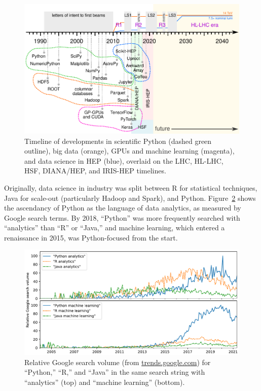 \documentclass[12pt,a4paper]{article}
\begin{document}
\begin{figure}
\centering
\includegraphics[width=0.95\linewidth]{fig/hllhc-python-timeline-paper.pdf}

\caption{Timeline of developments in scientific Python (dashed green outline), big data (orange), GPUs and machine learning (magenta), and data science in HEP (blue), overlaid on the LHC, HL-LHC, HSF, DIANA/HEP, and IRIS-HEP timelines. \label{fig:hllhc-python-timeline-paper}}
\end{figure}

Originally, data science in industry was split between R for statistical techniques, Java for scale-out (particularly Hadoop and Spark), and Python. Figure~\ref{fig:analytics-by-language} shows the ascendancy of Python as the language of data analytics, as measured by Google search terms. By 2018, ``Python'' was more frequently searched with ``analytics'' than ``R'' or ``Java,'' and machine learning, which entered a renaissance in 2015, was Python-focused from the start.

\begin{figure}
\centering
\includegraphics[width=0.8\linewidth]{fig/analytics-by-language.pdf}

\caption{Relative Google search volume (from \href{https://trends.google.com/}{trends.google.com}) for ``Python,'' ``R,'' and ``Java'' in the same search string with ``analytics'' (top) and ``machine learning'' (bottom). \label{fig:analytics-by-language}}
\end{figure}
\end{document}
